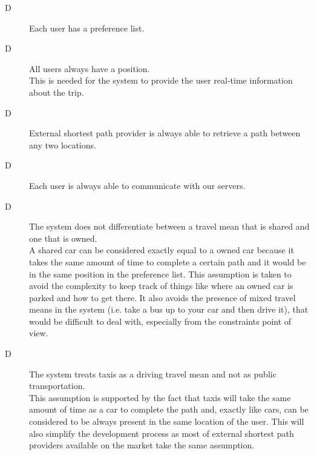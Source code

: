 \begin{description}
\item[D\thecountDom]  Each user has a preference list.

\item[D\thecountDom]  All users always have a position. \\ [0.1cm]
This is needed for the system to provide the user real-time information about the trip.

\item[D\thecountDom]  External shortest path provider is always able to retrieve a path between any two locations.

\item[D\thecountDom] Each user is always able to communicate with our servers.

\item[D\thecountDom] The system does not differentiate between a travel mean that is shared and one that is owned. \\ [0.1cm]
A shared car can be considered exactly equal to a owned car because it takes the same amount of time to complete a certain path and it would be in the same position in the preference list. This assumption is taken to avoid the complexity to keep track of things like where an owned car is parked and how to get there. It also avoids the presence of mixed travel means in the system (i.e. take a bus up to your car and then drive it), that would be difficult to deal with, especially from the constraints point of view.
\normalsize

\item[D\thecountDom] The system treats taxis as a driving travel mean and not as public transportation. \\ [0.1cm]
This assumption is supported by the fact that taxis will take the same amount of time as a car to complete the path and, exactly like cars, can be considered to be always present in the same location of the user. This will also simplify the development process as most of external shortest path providers available on the market take the same assumption.
\end{description}